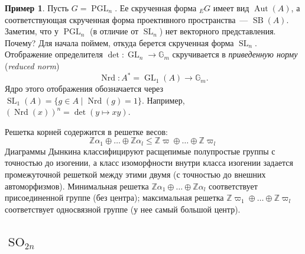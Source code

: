 \documentclass[a4paper]{article}
\DeclareMathOperator{\Aut}{Aut}
\DeclareMathOperator{\PGL}{PGL}
\DeclareMathOperator{\GL}{GL}
\DeclareMathOperator{\SL}{SL}
\DeclareMathOperator{\SB}{SB}
\DeclareMathOperator{\SO}{SO}
\DeclareMathOperator{\Nrd}{Nrd}
\theoremstyle{definition}
\newtheorem{example}[theorem]{Пример}
\begin{document}
\begin{example}
Пусть $G = \PGL_n$.
Ее скрученная форма ${}_{E}G$ имеет вид $\Aut(A)$, а соответствующая
скрученная форма проективного пространства~--- $\SB(A)$.
Заметим, что у $\PGL_n$ (в отличие от $\SL_n$) нет векторного представления.
Почему?
Для начала поймем, откуда берется скрученная форма $\SL_n$.
Отображение определителя $\det\colon\GL_n\to\mathbb{G}_m$
скручивается в \emph{приведенную норму} (\emph{reduced norm})
\[
\Nrd\colon A^* = \GL_1(A) \to \mathbb{G}_m.
\]
Ядро этого отображения обозначается через
$\SL_1(A) = \{g\in A\mid\Nrd(g)=1\}$.
Например, $(\Nrd(x))^n = \det(y\mapsto xy)$.

Решетка корней содержится в решетке весов:
\[
\mathbb{Z}\alpha_1\oplus\dots\oplus\mathbb{Z}\alpha_l
\leq
\mathbb{Z}\varpi\oplus\dots\oplus\mathbb{Z}\varpi_l
\]
Диаграммы Дынкина классифицируют расщепимые полупростые группы с точностью
до изогении, а класс изоморфности внутри класса изогении задается
промежуточной решеткой между этими двумя (с точностью до внешних
автоморфизмов).
Минимальная решетка $\mathbb{Z}\alpha_1\oplus\dots\oplus\mathbb{Z}\alpha_l$
соответствует присоединенной группе (без центра);
максимальная решетка $\mathbb{Z}\varpi_1\oplus\dots\oplus\mathbb{Z}\varpi_l$
соответствует односвязной группе (у нее самый большой центр).
\end{example}


\subsection{$\SO_{2n}$}
\end{document}
